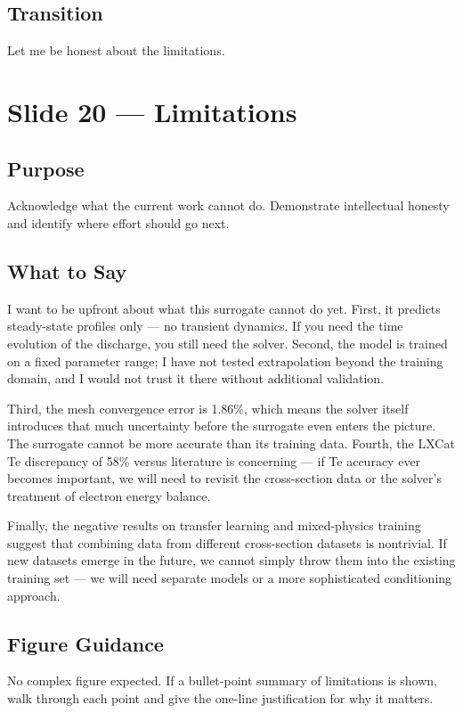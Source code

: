 \documentclass[12pt,a4paper]{article}
\begin{document}
\subsection*{Transition}
Let me be honest about the limitations.

\clearpage

\section{Slide 20 --- Limitations}
\label{sec:slide20}

\subsection*{Purpose}
Acknowledge what the current work cannot do. Demonstrate
intellectual honesty and identify where effort should go next.

\subsection*{What to Say}

I want to be upfront about what this surrogate cannot do yet. First,
it predicts steady-state profiles only --- no transient dynamics.
If you need the time evolution of the discharge, you still need the
solver. Second, the model is trained on a fixed parameter range; I
have not tested extrapolation beyond the training domain, and I would
not trust it there without additional validation.

Third, the mesh convergence error is 1.86\%, which means the solver
itself introduces that much uncertainty before the surrogate even
enters the picture. The surrogate cannot be more accurate than its
training data. Fourth, the LXCat Te discrepancy of 58\% versus
literature is concerning --- if Te accuracy ever becomes important,
we will need to revisit the cross-section data or the solver's
treatment of electron energy balance.

Finally, the negative results on transfer learning and mixed-physics
training suggest that combining data from different cross-section
datasets is nontrivial. If new datasets emerge in the future, we
cannot simply throw them into the existing training set --- we will
need separate models or a more sophisticated conditioning approach.

\subsection*{Figure Guidance}
No complex figure expected. If a bullet-point summary of limitations
is shown, walk through each point and give the one-line justification
for why it matters.
\end{document}
